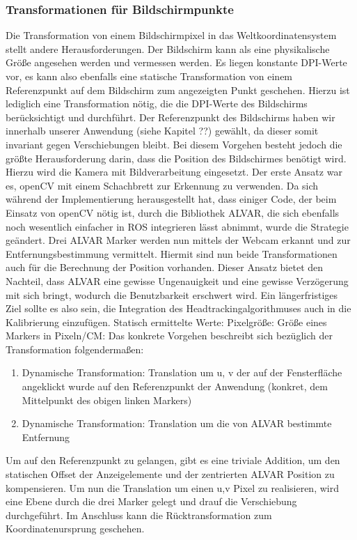 \subsubsection{Transformationen für Bildschirmpunkte}
\label{ssection:alva}
Die Transformation von einem Bildschirmpixel in das Weltkoordinatensystem stellt andere Herausforderungen. Der Bildschirm kann als eine physikalische Größe angesehen werden und vermessen werden. Es liegen konstante DPI-Werte vor, es kann also ebenfalls eine statische Transformation von einem Referenzpunkt auf dem Bildschirm zum angezeigten Punkt geschehen. Hierzu ist lediglich eine Transformation nötig, die die DPI-Werte des Bildschirms berücksichtigt und durchführt. Der Referenzpunkt des Bildschirms haben wir innerhalb unserer Anwendung (siehe Kapitel ??) gewählt, da dieser somit invariant gegen Verschiebungen bleibt. Bei diesem Vorgehen besteht jedoch die größte Herausforderung darin, dass die Position des Bildschirmes benötigt wird. Hierzu wird die Kamera mit Bildverarbeitung eingesetzt. Der erste Ansatz war es, openCV mit einem Schachbrett zur Erkennung zu verwenden. Da sich während der Implementierung herausgestellt hat, dass einiger Code, der beim Einsatz von openCV nötig ist, durch die Bibliothek ALVAR, die sich ebenfalls noch wesentlich einfacher in ROS integrieren lässt abnimmt, wurde die Strategie geändert. Drei ALVAR Marker werden nun mittels der Webcam erkannt und zur Entfernungsbestimmung vermittelt. Hiermit sind nun beide Transformationen auch für die Berechnung der Position vorhanden. Dieser Ansatz bietet den Nachteil, dass ALVAR eine gewisse Ungenauigkeit und eine gewisse Verzögerung mit sich bringt, wodurch die Benutzbarkeit erschwert wird. Ein längerfristiges Ziel sollte es also sein, die Integration des Headtrackingalgorithmuses auch in die Kalibrierung einzufügen.
    Statisch ermittelte Werte:
    Pixelgröße:
    Größe eines Markers in Pixeln/CM:
Das konkrete Vorgehen beschreibt sich bezüglich der Transformation folgendermaßen:

   \begin{enumerate}
      \item Dynamische Transformation:  Translation  um u, v der auf der Fensterfläche angeklickt wurde auf den Referenzpunkt der Anwendung (konkret, dem Mittelpunkt des obigen linken Markers) 
      \item Dynamische Transformation: Translation um die von ALVAR bestimmte Entfernung
   \end{enumerate}

Um auf den Referenzpunkt zu gelangen, gibt es eine triviale Addition, um den statischen Offset der Anzeigelemente und der zentrierten ALVAR Position zu kompensieren. Um nun die Translation um einen u,v Pixel zu realisieren, wird eine Ebene durch die drei Marker gelegt und drauf die Verschiebung durchgeführt. Im Anschluss kann die Rücktransformation zum Koordinatenursprung geschehen.

